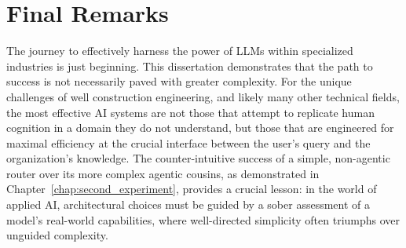 \section{Final Remarks}
\label{sec:conclusion_final}

    The journey to effectively harness the power of LLMs within specialized industries is just beginning. This dissertation demonstrates that the path to success is not necessarily paved with greater complexity. For the unique challenges of well construction engineering, and likely many other technical fields, the most effective AI systems are not those that attempt to replicate human cognition in a domain they do not understand, but those that are engineered for maximal efficiency at the crucial interface between the user's query and the organization's knowledge. The counter-intuitive success of a simple, non-agentic router over its more complex agentic cousins, as demonstrated in Chapter~\ref{chap:second_experiment}, provides a crucial lesson: in the world of applied AI, architectural choices must be guided by a sober assessment of a model's real-world capabilities, where well-directed simplicity often triumphs over unguided complexity.